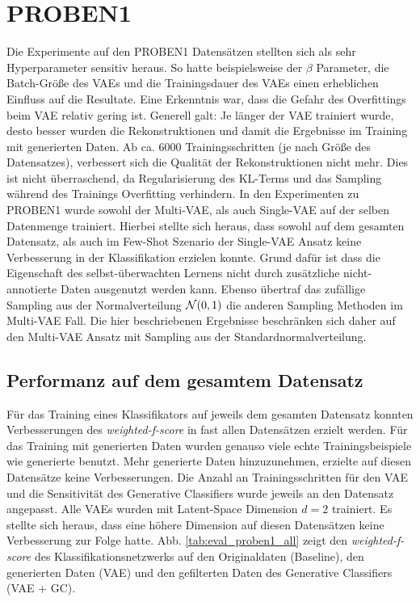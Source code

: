 \section{PROBEN1}
Die Experimente auf den PROBEN1 Datensätzen stellten sich als sehr Hyperparameter sensitiv heraus. So hatte beispielsweise der $\beta$ Parameter, die Batch-Größe des VAEs und die Trainingsdauer des VAEs einen erheblichen Einfluss auf die Resultate. Eine Erkenntnis war, dass die Gefahr des Overfittings beim VAE relativ gering ist. Generell galt: Je länger der VAE trainiert wurde, desto besser wurden die Rekonstruktionen und damit die Ergebnisse im Training mit generierten Daten. Ab ca. 6000 Trainingsschritten (je nach Größe des Datensatzes), verbessert sich die Qualität der Rekonstruktionen nicht mehr. Dies ist nicht überraschend, da Regularisierung des KL-Terms und das Sampling während des Trainings Overfitting verhindern.
In den Experimenten zu PROBEN1 wurde sowohl der Multi-VAE, als auch Single-VAE auf der selben Datenmenge trainiert. Hierbei stellte sich heraus, dass sowohl auf dem gesamten Datensatz, als auch im Few-Shot Szenario der Single-VAE Ansatz keine Verbesserung in der Klassifikation erzielen konnte. Grund dafür ist dass die Eigenschaft des selbst-überwachten Lernens nicht durch zusätzliche nicht-annotierte Daten ausgenutzt werden kann. Ebenso übertraf das zufällige Sampling aus der Normalverteilung $\mathcal{N}(0, 1)$ die anderen Sampling Methoden im Multi-VAE Fall. Die hier beschriebenen Ergebnisse beschränken sich daher auf den Multi-VAE Ansatz mit Sampling aus der Standardnormalverteilung.

\subsection{Performanz auf dem gesamtem Datensatz}
Für das Training eines Klassifikators auf jeweils dem gesamten Datensatz konnten Verbesserungen des \textit{weighted-f-score} in fast allen Datensätzen erzielt werden. Für das Training mit generierten Daten wurden genauso viele echte Trainingsbeispiele wie generierte benutzt. Mehr generierte Daten hinzuzunehmen, erzielte auf diesen Datensätze keine Verbesserungen. Die Anzahl an Trainingsschritten für den VAE und die Sensitivität des Generative Classifiers wurde jeweils an den Datensatz angepasst. Alle VAEs wurden mit Latent-Space Dimension $d = 2$ trainiert. Es stellte sich heraus, dass eine höhere Dimension auf diesen Datensätzen keine Verbesserung zur Folge hatte. Abb. \ref{tab:eval_proben1_all} zeigt den \textit{weighted-f-score} des Klassifikationsnetzwerks auf den Originaldaten (Baseline), den generierten Daten (VAE) und den gefilterten Daten des Generative Classifiers (VAE + GC). \\

